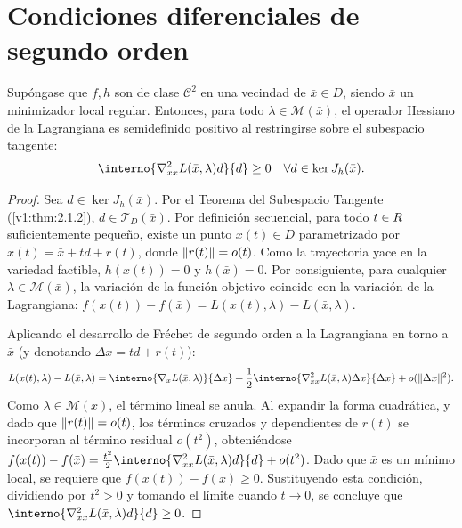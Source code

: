 
\section{Condiciones diferenciales de segundo orden}
\label{v1:sec:2.3}

\begin{theorem}\label{v1:thm:2.3.1}
	Supóngase que $f, h$ son de clase $\mathcal{C}^2$ en una vecindad de $\bar{x} \in D$, siendo $\bar{x}$ un minimizador local regular. Entonces, para todo $\lambda \in \mathcal{M}(\bar{x})$, el operador Hessiano de la Lagrangiana es semidefinido positivo al restringirse sobre el subespacio tangente:
	\begin{equation}
		\interno{\nabla_{xx}^2 L(\bar{x}, \lambda) d}{d} \ge 0 \quad \forall d \in \ker J_h(\bar{x}).
        \label{v1:eq:2.2}
	\end{equation}
\end{theorem}

\begin{proof}
	Sea $d \in \ker J_h(\bar{x})$. Por el Teorema del Subespacio Tangente (\cref{v1:thm:2.1.2}), $d \in \mathcal{T}_D(\bar{x})$. Por definición secuencial, para todo $t \in R$ suficientemente pequeño, existe un punto $x(t) \in D$ parametrizado por $x(t) = \bar{x} + td + r(t)$, donde $\lVert r(t)\rVert = o(t)$. Como la trayectoria yace en la variedad factible, $h(x(t)) = 0$ y $h(\bar{x}) = 0$. Por consiguiente, para cualquier $\lambda \in \mathcal{M}(\bar{x})$, la variación de la función objetivo coincide con la variación de la Lagrangiana: $f(x(t)) - f(\bar{x}) = L(x(t), \lambda) - L(\bar{x}, \lambda)$.
 
 Aplicando el desarrollo de Fréchet de segundo orden a la Lagrangiana en torno a $\bar{x}$ (y denotando $\Delta x = td + r(t)$):
 \[
 L(x(t), \lambda) - L(\bar{x}, \lambda) = \interno{\nabla_x L(\bar{x}, \lambda)}{\Delta x} + \frac{1}{2}\interno{\nabla_{xx}^2 L(\bar{x}, \lambda)\Delta x}{\Delta x} + o(\norm{\Delta x}^2).
 \]
 Como $\lambda \in \mathcal{M}(\bar{x})$, el término lineal se anula. Al expandir la forma cuadrática, y dado que $\lVert r(t)\rVert = o(t)$, los términos cruzados y dependientes de $r(t)$ se incorporan al término residual $o(t^2)$, obteniéndose $f(x(t)) - f(\bar{x}) = \frac{t^2}{2}\interno{\nabla_{xx}^2 L(\bar{x}, \lambda)d}{d} + o(t^2)$. Dado que $\bar{x}$ es un mínimo local, se requiere que $f(x(t)) - f(\bar{x}) \ge 0$. Sustituyendo esta condición, dividiendo por $t^2 > 0$ y tomando el límite cuando $t \to 0$, se concluye que $\interno{\nabla_{xx}^2 L(\bar{x}, \lambda)d}{d} \ge 0$.
\end{proof}


